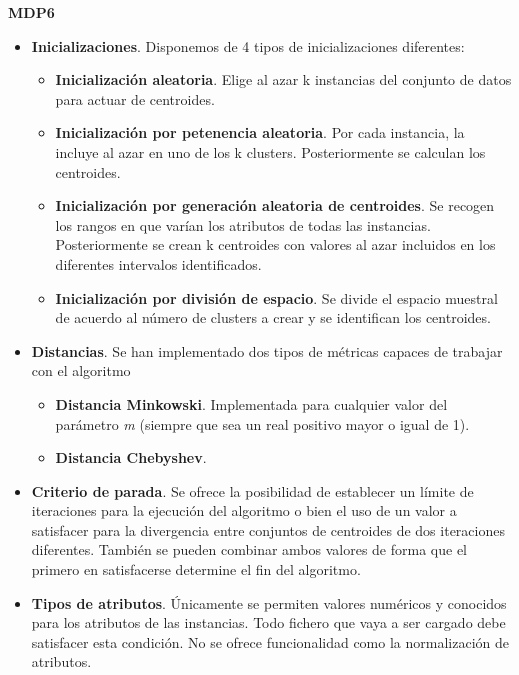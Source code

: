 \documentclass[a4paper]{report}
\begin{document}
	
	\begin{center}
		\textbf{MDP6}
	\end{center}
	
	\begin{itemize}
		\item	\textbf{Inicializaciones}. Disponemos de 4 tipos de inicializaciones diferentes:
			\begin{itemize}
			\item	\textbf{Inicialización aleatoria}. Elige al azar k instancias del conjunto de datos para actuar de centroides.
			\item	\textbf{Inicialización por petenencia aleatoria}. Por cada instancia, la incluye al azar en uno de los k clusters. Posteriormente se calculan los centroides.
			\item	\textbf{Inicialización por generación aleatoria de centroides}. Se recogen los rangos en que varían los atributos de todas las instancias. Posteriormente se crean k centroides con valores al azar incluidos en los diferentes intervalos identificados.
			\item	\textbf{Inicialización por división de espacio}. Se divide el espacio muestral de acuerdo al número de clusters a crear y se identifican los centroides.
			\end{itemize}
			
		\item	\textbf{Distancias}. Se han implementado dos tipos de métricas capaces de trabajar con el algoritmo
			\begin{itemize}
			\item	\textbf{Distancia Minkowski}. Implementada para cualquier valor del parámetro \textit{m} (siempre que sea un real positivo mayor o igual de 1).
			\item	\textbf{Distancia Chebyshev}.
			\end{itemize}
			
		\item	\textbf{Criterio de parada}. Se ofrece la posibilidad de establecer un límite de iteraciones para la ejecución del algoritmo o bien el uso de un valor a satisfacer para la divergencia entre conjuntos de centroides de dos iteraciones diferentes. También se pueden combinar ambos valores de forma que el primero en satisfacerse determine el fin del algoritmo.
		
		\item	\textbf{Tipos de atributos}. Únicamente se permiten valores numéricos y conocidos para los atributos de las instancias. Todo fichero que vaya a ser cargado debe satisfacer esta condición. No se ofrece funcionalidad como la normalización de atributos.
		

\end{itemize}
\end{document}
